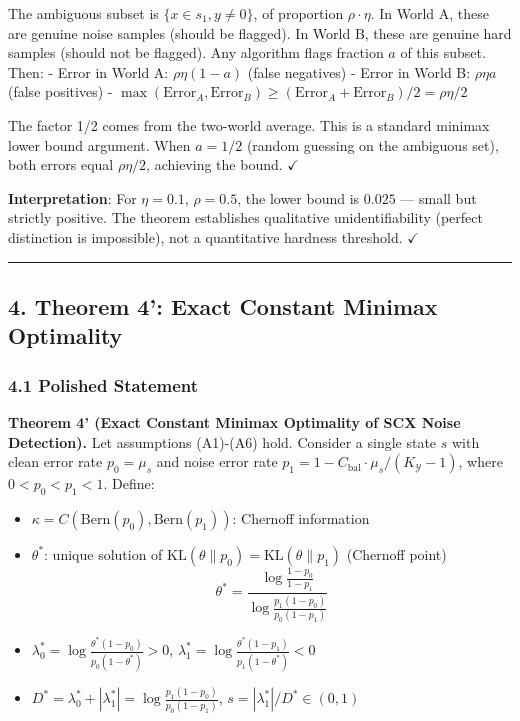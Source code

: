 \documentclass[
  12pt,
]{ctexart}
\providecommand{\tightlist}{%
  \setlength{\itemsep}{0pt}\setlength{\parskip}{0pt}}
\begin{document}
The ambiguous subset is \(\{x \in s_1, y \neq 0\}\), of proportion
\(\rho \cdot \eta\). In World A, these are genuine noise samples (should
be flagged). In World B, these are genuine hard samples (should not be
flagged). Any algorithm flags fraction \(a\) of this subset. Then: -
Error in World A: \(\rho\eta(1-a)\) (false negatives) - Error in World
B: \(\rho\eta a\) (false positives) -
\(\max(\text{Error}_A, \text{Error}_B) \geq (\text{Error}_A + \text{Error}_B)/2 = \rho\eta/2\)

The factor 1/2 comes from the two-world average. This is a standard
minimax lower bound argument. When \(a = 1/2\) (random guessing on the
ambiguous set), both errors equal \(\rho\eta/2\), achieving the bound.
\(\checkmark\)

\textbf{Interpretation}: For \(\eta = 0.1\), \(\rho = 0.5\), the lower
bound is \(0.025\) --- small but strictly positive. The theorem
establishes qualitative unidentifiability (perfect distinction is
impossible), not a quantitative hardness threshold. \(\checkmark\)

\begin{center}\rule{0.5\linewidth}{0.5pt}\end{center}

\subsection{4. Theorem 4': Exact Constant Minimax
Optimality}\label{theorem-4-exact-constant-minimax-optimality}

\subsubsection{4.1 Polished Statement}\label{polished-statement-3}

\textbf{Theorem 4' (Exact Constant Minimax Optimality of SCX Noise
Detection).} Let assumptions (A1)-(A6) hold. Consider a single state
\(s\) with clean error rate \(p_0 = \mu_s\) and noise error rate
\(p_1 = 1 - C_{\text{bal}} \cdot \mu_s/(K_{\mathcal{Y}}-1)\), where
\(0 < p_0 < p_1 < 1\). Define:

\begin{itemize}
\tightlist
\item
  \(\kappa = C(\text{Bern}(p_0), \text{Bern}(p_1))\): Chernoff
  information
\item
  \(\theta^*\): unique solution of
  \(\text{KL}(\theta\|p_0) = \text{KL}(\theta\|p_1)\) (Chernoff point)
  \[\theta^* = \frac{\log\frac{1-p_0}{1-p_1}}{\log\frac{p_1(1-p_0)}{p_0(1-p_1)}}\]
\item
  \(\lambda_0^* = \log\frac{\theta^*(1-p_0)}{p_0(1-\theta^*)} > 0\),
  \(\lambda_1^* = \log\frac{\theta^*(1-p_1)}{p_1(1-\theta^*)} < 0\)
\item
  \(D^* = \lambda_0^* + |\lambda_1^*| = \log\frac{p_1(1-p_0)}{p_0(1-p_1)}\),
  \(s = |\lambda_1^*| / D^* \in (0,1)\)
\end{itemize}
\end{document}

